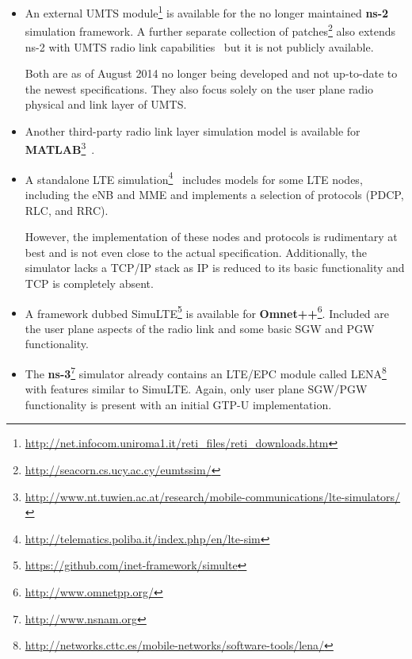 \begin{itemize}
	\item An external \gls{UMTS} module\footnote{\url{http://net.infocom.uniroma1.it/reti_files/reti_downloads.htm}} is available for the no longer maintained \textbf{ns-2} simulation framework. A further separate collection of patches\footnote{\url{http://seacorn.cs.ucy.ac.cy/eumtssim/}} also extends ns-2 with \gls{UMTS} radio link capabilities~\cite{vranjevs2011use} but it is not publicly available.

	Both are as of August 2014 no longer being developed and not up-to-date to the newest specifications. They also focus solely on the user plane radio physical and link layer of \gls{UMTS}.

	\item Another third-party radio link layer simulation model is available for \textbf{MATLAB}\footnote{\url{http://www.nt.tuwien.ac.at/research/mobile-communications/lte-simulators/}}~\cite{mehlfuhrer2011vienna}.

	\item A standalone \gls{LTE} simulation\footnote{\url{http://telematics.poliba.it/index.php/en/lte-sim}}~\cite{5634134} includes models for some \gls{LTE} nodes, including the \gls{eNB} and \gls{MME} and implements a selection of protocols (\gls{PDCP}, \gls{RLC}, and \gls{RRC}).

	However, the implementation of these nodes and protocols is rudimentary at best and is not even close to the actual specification. Additionally, the simulator lacks a \gls{TCP}/\gls{IP} stack as \gls{IP} is reduced to its basic functionality and \gls{TCP} is completely absent.

	\item A framework dubbed SimuLTE\footnote{\url{https://github.com/inet-framework/simulte}} is available for \textbf{Omnet++}\footnote{\url{http://www.omnetpp.org/}}. Included are the user plane aspects of the radio link and some basic \gls{SGW} and \gls{PGW} functionality.

	\item The \textbf{ns-3}\footnote{\url{http://www.nsnam.org}} simulator already contains an \gls{LTE}/\gls{EPC} module called LENA\footnote{\url{http://networks.cttc.es/mobile-networks/software-tools/lena/}}~\cite{Baldo:2013:OSM:2507924.2507940} with features similar to SimuLTE. Again, only user plane \gls{SGW}/\gls{PGW} functionality is present with an initial \gls{GTP-U} implementation.
\end{itemize}


